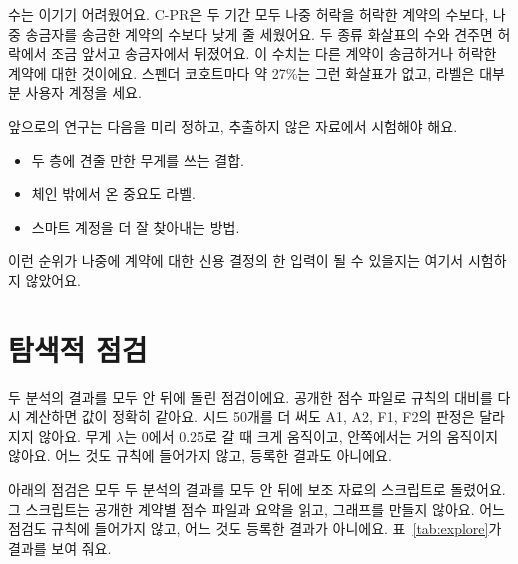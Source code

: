 수는 이기기 어려웠어요. C-PR은 두 기간 모두 나중 허락을 허락한 계약의 수보다, 나중 송금자를 송금한 계약의 수보다 낮게 줄 세웠어요. 두 종류 화살표의 수와 견주면 허락에서 조금 앞서고 송금자에서 뒤졌어요. 이 수치는 다른 계약이 송금하거나 허락한 계약에 대한 것이에요. 스펜더 코호트마다 약 27\%는 그런 화살표가 없고, 라벨은 대부분 사용자 계정을 세요.

앞으로의 연구는 다음을 미리 정하고, 추출하지 않은 자료에서 시험해야 해요.
\begin{itemize}
\item 두 층에 견줄 만한 무게를 쓰는 결합.
\item 체인 밖에서 온 중요도 라벨.
\item 스마트 계정을 더 잘 찾아내는 방법.
\end{itemize}
이런 순위가 나중에 계약에 대한 신용 결정의 한 입력이 될 수 있을지는 여기서 시험하지 않았어요.

\appendix
\section{탐색적 점검}
\label{app:explore}

\begin{yoji}
두 분석의 결과를 모두 안 뒤에 돌린 점검이에요. 공개한 점수 파일로 규칙의 대비를 다시 계산하면 값이 정확히 같아요. 시드 50개를 더 써도 A1, A2, F1, F2의 판정은 달라지지 않아요. 무게 $\lambda$는 0에서 0.25로 갈 때 크게 움직이고, 안쪽에서는 거의 움직이지 않아요. 어느 것도 규칙에 들어가지 않고, 등록한 결과도 아니에요.
\end{yoji}

아래의 점검은 모두 두 분석의 결과를 모두 안 뒤에 보조 자료의 스크립트로 돌렸어요. 그 스크립트는 공개한 계약별 점수 파일과 요약을 읽고, 그래프를 만들지 않아요. 어느 점검도 규칙에 들어가지 않고, 어느 것도 등록한 결과가 아니에요. 표~\ref{tab:explore}가 결과를 보여 줘요.

